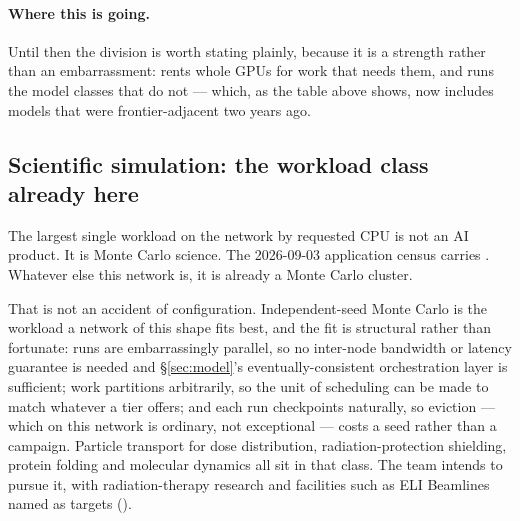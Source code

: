 \paragraph{Where this is going.}  Until then the
division is worth stating plainly, because it is a strength rather than an embarrassment:
\FluxEdge{} rents whole GPUs for work that needs them, and \FluxCloud{} runs the model classes that
do not --- which, as the table above shows, now includes models that were frontier-adjacent two years
ago.

\subsection{Scientific simulation: the workload class already here}
\label{sec:sci-simulation}

The largest single workload on the network by requested CPU is not an AI product. It is Monte Carlo
science. The 2026-09-03 application census carries 
.
Whatever else this network is, it is already a Monte Carlo cluster.

That is not an accident of configuration. Independent-seed Monte Carlo is the workload a network of
this shape fits best, and the fit is structural rather than fortunate: runs are embarrassingly
parallel, so no inter-node bandwidth or latency guarantee is needed and \S\ref{sec:model}'s
eventually-consistent orchestration layer is sufficient; work partitions arbitrarily, so the unit of
scheduling can be made to match whatever a tier offers; and each run checkpoints naturally, so
eviction --- which on this network is ordinary, not exceptional --- costs a seed rather than a
campaign. Particle transport for dose distribution, radiation-protection shielding, protein folding
and molecular dynamics all sit in that class. The team intends to pursue it, with radiation-therapy
research and facilities such as ELI Beamlines named as targets  (\planned).

